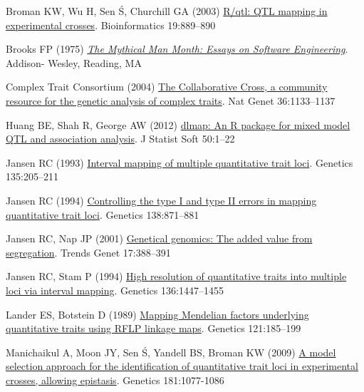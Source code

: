 \documentclass[letterpaper]{article}
\newenvironment{hanging}
{\begin{list}{}
        {\setlength{\labelwidth}{0in}
         \setlength{\leftmargin}{1em}
         \setlength{\itemindent}{-1em}
         \setlength{\parsep}{0in}
         \setlength{\itemsep}{0in}
        }
}
{\end{list}}
\begin{document}
\begin{multicols}{2}
\begin{hanging}
\item Broman KW, Wu H, Sen \'S, Churchill GA (2003)
  \href{http://www.ncbi.nlm.nih.gov/pubmed/12724300}{R/qtl: QTL
    mapping in experimental crosses}. Bioinformatics 19:889--890

\item Brooks FP (1975)
  \href{http://archive.org/details/mythicalmanmonth00fred}{\emph{The
      Mythical Man Month: Essays on Software Engineering}}. Addison-
  Wesley, Reading, MA

\item Complex Trait Consortium (2004)
  \href{http://www.ncbi.nlm.nih.gov/pubmed/15514660}{The Collaborative
  Cross, a community resource for the genetic analysis of complex
  traits}. Nat Genet 36:1133--1137

\item Huang BE, Shah R, George AW (2012)
  \href{http://www.jstatsoft.org/v50/i06/}{dlmap: An R package for
    mixed model QTL and association analysis}. J Statist Soft 50:1--22

\item Jansen RC (1993)
  \href{http://www.ncbi.nlm.nih.gov/pubmed/8224820}{Interval mapping
    of multiple quantitative trait loci}. Genetics 135:205--211

\item Jansen RC (1994)
  \href{http://www.ncbi.nlm.nih.gov/pubmed/7851782}{Controlling the
    type I and type II errors in mapping quantitative trait
    loci}. Genetics 138:871--881

\item Jansen RC, Nap JP (2001)
  \href{http://www.ncbi.nlm.nih.gov/pubmed/11418218}{Genetical
    genomics: The added value from segregation}. Trends Genet
  17:388--391

\item Jansen RC, Stam P (1994)
  \href{http://www.ncbi.nlm.nih.gov/pubmed/8013917}{High resolution of
    quantitative traits into multiple loci via interval
    mapping}. Genetics 136:1447--1455

\item Lander ES, Botstein D (1989)
  \href{http://www.ncbi.nlm.nih.gov/pubmed/2563713}{Mapping Mendelian
    factors underlying quantitative traits using RFLP linkage
    maps}. Genetics 121:185--199

\item Manichaikul A, Moon JY, Sen \'S, Yandell BS, Broman KW (2009)
  \href{http://www.ncbi.nlm.nih.gov/pubmed/19104078}{A model selection
    approach for the identification of quantitative trait loci in
    experimental crosses, allowing epistasis}. Genetics 181:1077-1086


\end{hanging}
\end{multicols}
\end{document}
